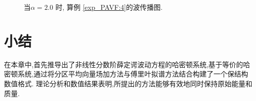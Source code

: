 \begin{figure}[H]
\begin{center}
{			} 
			\caption{当$\alpha=2.0$ 时, 算例 \ref{exp_PAVF:4}的波传播图.}
			\label{fig_PAVF:16}
			\end{center}
			\end{figure}

\section{小结}\label{Section_PAVF: 5}

在本章中,首先推导出了非线性分数阶薛定谔波动方程的哈密顿系统,基于等价的哈密顿系统,通过将分区平均向量场加方法与傅里叶拟谱方法结合构建了一个保结构数值格式.
理论分析和数值结果表明,所提出的方法能够有效地同时保持原始能量和质量.
